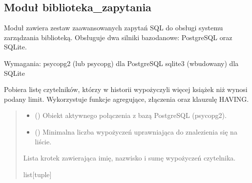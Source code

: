 \documentclass[letterpaper,10pt,english]{sphinxmanual}
\begin{document}
\subsection{Moduł biblioteka\_zapytania}
\label{\detokenize{rozdzial_5/index:modul-biblioteka-zapytania}}\label{\detokenize{rozdzial_5/index:module-biblioteka_zapytania}}
\sphinxAtStartPar
Moduł zawiera zestaw zaawansowanych zapytań SQL do obsługi systemu zarządzania biblioteką.
Obsługuje dwa silniki bazodanowe: PostgreSQL oraz SQLite.

\sphinxAtStartPar
Wymagania:
\sphinxhyphen{} psycopg2 (lub psycopg) dla PostgreSQL
\sphinxhyphen{} sqlite3 (wbudowany) dla SQLite

\begin{fulllineitems}
\label{\detokenize{rozdzial_5/index:biblioteka_zapytania.get_aktywni_czytelnicy_powyzej_limitu}}
\pysigstartsignatures
\pysiglinewithargsret
{}
{\sphinxparamcomma {}}
{}
\pysigstopsignatures
\sphinxAtStartPar
Pobiera listę czytelników, którzy w historii wypożyczyli więcej książek niż wynosi podany limit.
Wykorzystuje funkcje agregujące, złączenia oraz klauzulę HAVING.
\begin{quote}\begin{description}
\begin{itemize}
\item {} 
\sphinxAtStartPar
{} () \textendash{} Obiekt aktywnego połączenia z bazą PostgreSQL (psycopg2).

\item {} 
\sphinxAtStartPar
{} () \textendash{} Minimalna liczba wypożyczeń uprawniająca do znalezienia się na liście.

\end{itemize}

\sphinxAtStartPar
Lista krotek zawierająca imię, nazwisko i sumę wypożyczeń czytelnika.

\sphinxAtStartPar
list{[}tuple{]}

\end{description}\end{quote}

\end{fulllineitems}
\end{document}
